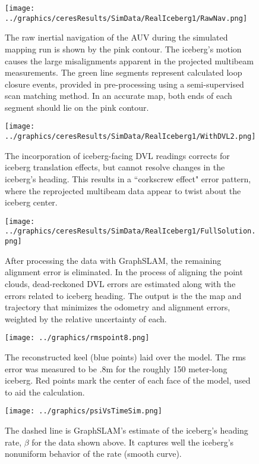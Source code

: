  \begin{figure}[!htb]
   \centering
   \texttt{[image: ../graphics/ceresResults/SimData/RealIceberg1/RawNav.png]} %
   \caption{The raw inertial navigation of the AUV during the simulated mapping run is shown by the pink contour. The iceberg's motion causes the large misalignments apparent in the projected multibeam measurements. The green line segments represent calculated loop closure events, provided in pre-processing using a semi-supervised scan matching method. In an accurate map, both ends of each segment should lie on the pink contour.}
   \label{fig:RawNav}
\end{figure}

 \begin{figure}[!htb]
   \centering
   \texttt{[image: ../graphics/ceresResults/SimData/RealIceberg1/WithDVL2.png]} %
   \caption{The incorporation of iceberg-facing DVL readings corrects for iceberg translation effects, but cannot resolve changes in the iceberg's heading. This results in a ``corkscrew effect" error pattern, where the reprojected multibeam data appear to twist about the iceberg center.}
   \label{fig:WithDVL1}
\end{figure}

 \begin{figure}[!htb]
   \centering
   \texttt{[image: ../graphics/ceresResults/SimData/RealIceberg1/FullSolution.png]} %
   \caption{After processing the data with GraphSLAM, the remaining alignment error is eliminated. In the process of aligning the point clouds, dead-reckoned DVL errors are estimated along with the errors related to iceberg heading. The output is the the map and trajectory that minimizes the odometry and alignment errors, weighted by the relative uncertainty of each. }
   \label{fig:FullSimSol}
\end{figure}

 \begin{figure}[!htb]
   \centering
   \texttt{[image: ../graphics/rmspoint8.png]} %
   \caption{The reconstructed keel (blue points) laid over the model. The rms error was measured to be .8m for the roughly 150 meter-long iceberg. Red points mark the center of each face of the model, used to aid the calculation.}
   \label{fig:RMS}
\end{figure}

 \begin{figure}[!htb]
   \centering
   \texttt{[image: ../graphics/psiVsTimeSim.png]} %
   \caption{The dashed line is GraphSLAM's estimate of the iceberg's heading rate, $\beta$ for the data shown above. It captures well the iceberg's nonuniform behavior of the rate (smooth curve).}
   \label{fig:PsiEst}
\end{figure}

